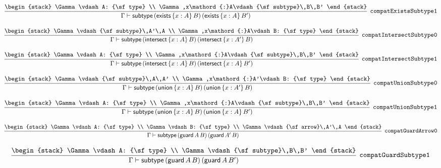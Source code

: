 \[
\infer[{\tt compatExistsSubtype1}]{\Gamma \vdash {\sf subtype}\,({\sf exists}\,\{x : A\}\,B)\,({\sf exists}\,\{x : A\}\,B')}{
\begin{stack}
\Gamma \vdash A: {\sf type}
\\
\Gamma ,x\mathord{:}A\vdash {\sf subtype}\,B\,B'
\end{stack}}
\]

\[
\infer[{\tt compatIntersectSubtype0}]{\Gamma \vdash {\sf subtype}\,({\sf intersect}\,\{x : A\}\,B)\,({\sf intersect}\,\{x : A'\}\,B)}{
\begin{stack}
\Gamma \vdash {\sf subtype}\,A'\,A
\\
\Gamma ,x\mathord{:}A\vdash B: {\sf type}
\end{stack}}
\]

\[
\infer[{\tt compatIntersectSubtype1}]{\Gamma \vdash {\sf subtype}\,({\sf intersect}\,\{x : A\}\,B)\,({\sf intersect}\,\{x : A\}\,B')}{
\begin{stack}
\Gamma \vdash A: {\sf type}
\\
\Gamma ,x\mathord{:}A\vdash {\sf subtype}\,B\,B'
\end{stack}}
\]

\[
\infer[{\tt compatUnionSubtype0}]{\Gamma \vdash {\sf subtype}\,({\sf union}\,\{x : A\}\,B)\,({\sf union}\,\{x : A'\}\,B)}{
\begin{stack}
\Gamma \vdash {\sf subtype}\,A\,A'
\\
\Gamma ,x\mathord{:}A'\vdash B: {\sf type}
\end{stack}}
\]

\[
\infer[{\tt compatUnionSubtype1}]{\Gamma \vdash {\sf subtype}\,({\sf union}\,\{x : A\}\,B)\,({\sf union}\,\{x : A\}\,B')}{
\begin{stack}
\Gamma \vdash A: {\sf type}
\\
\Gamma ,x\mathord{:}A\vdash {\sf subtype}\,B\,B'
\end{stack}}
\]

\[
\infer[{\tt compatGuardArrow0}]{\Gamma \vdash {\sf subtype}\,({\sf guard}\,A\,B)\,({\sf guard}\,A'\,B)}{
\begin{stack}
\Gamma \vdash A: {\sf type}
\\
\Gamma \vdash B: {\sf type}
\\
\Gamma \vdash {\sf arrow}\,A'\,A
\end{stack}}
\]

\[
\infer[{\tt compatGuardSubtype1}]{\Gamma \vdash {\sf subtype}\,({\sf guard}\,A\,B)\,({\sf guard}\,A\,B')}{
\begin{stack}
\Gamma \vdash A: {\sf type}
\\
\Gamma \vdash {\sf subtype}\,B\,B'
\end{stack}}
\]

